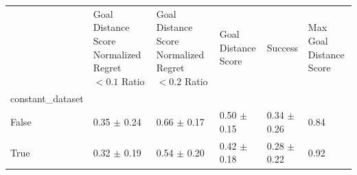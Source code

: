 \begin{tabular}{llllll}
\toprule
 & Goal Distance Score Normalized Regret $< 0.1$ Ratio & Goal Distance Score Normalized Regret $< 0.2$ Ratio & Goal Distance Score & Success & Max Goal Distance Score \\
constant_dataset &  &  &  &  &  \\
\midrule
False & 0.35 $\pm$ 0.24 & 0.66 $\pm$ 0.17 & 0.50 $\pm$ 0.15 & 0.34 $\pm$ 0.26 & 0.84 \\
True & 0.32 $\pm$ 0.19 & 0.54 $\pm$ 0.20 & 0.42 $\pm$ 0.18 & 0.28 $\pm$ 0.22 & 0.92 \\
\bottomrule
\end{tabular}
